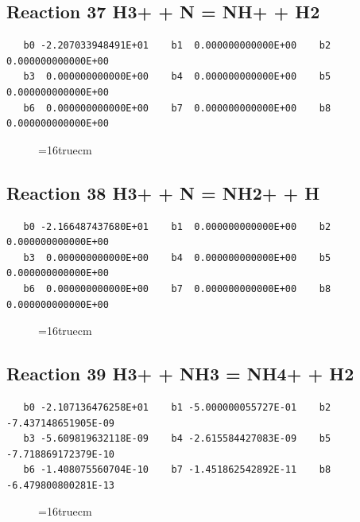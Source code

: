 \documentclass[12pt,dvipdfm]{article}
\begin{document}
\subsection{
Reaction 37 H3+ + N = NH+ + H2}
\begin{small}\begin{verbatim}
   b0 -2.207033948491E+01    b1  0.000000000000E+00    b2  0.000000000000E+00
   b3  0.000000000000E+00    b4  0.000000000000E+00    b5  0.000000000000E+00
   b6  0.000000000000E+00    b7  0.000000000000E+00    b8  0.000000000000E+00
   \end{verbatim}\end{small}
\begin{figure}[h!]
\label{n2rates}
\epsfxsize=16truecm
\end{figure}
\newpage

\subsection{
Reaction 38 H3+ + N = NH2+ + H}
\begin{small}\begin{verbatim}
   b0 -2.166487437680E+01    b1  0.000000000000E+00    b2  0.000000000000E+00
   b3  0.000000000000E+00    b4  0.000000000000E+00    b5  0.000000000000E+00
   b6  0.000000000000E+00    b7  0.000000000000E+00    b8  0.000000000000E+00
   \end{verbatim}\end{small}
\begin{figure}[h!]
\label{n2rates}
\epsfxsize=16truecm
\end{figure}
\newpage

\subsection{
Reaction 39 H3+ + NH3 = NH4+ + H2}
\begin{small}\begin{verbatim}
   b0 -2.107136476258E+01    b1 -5.000000055727E-01    b2 -7.437148651905E-09
   b3 -5.609819632118E-09    b4 -2.615584427083E-09    b5 -7.718869172379E-10
   b6 -1.408075560704E-10    b7 -1.451862542892E-11    b8 -6.479800800281E-13
   \end{verbatim}\end{small}
\begin{figure}[h!]
\label{n2rates}
\epsfxsize=16truecm
\end{figure}
\newpage
\end{document}

